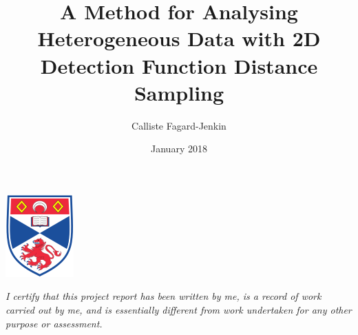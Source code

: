 \documentclass[11pt]{article}
\title{A Method for Analysing Heterogeneous Data with 2D Detection Function Distance Sampling}
\date{January 2018}
\author{Calliste Fagard-Jenkin}
\begin{document}
\maketitle
\begin{center}
\includegraphics[scale=1]{Logo}
\end{center}


\newpage
\emph{I  certify  that  this  project  report  has  been  written  by  me,  is  a  record  of  work  carried  out  by  me,  and  is essentially different from work undertaken for any other purpose or assessment.}
\end{document}
